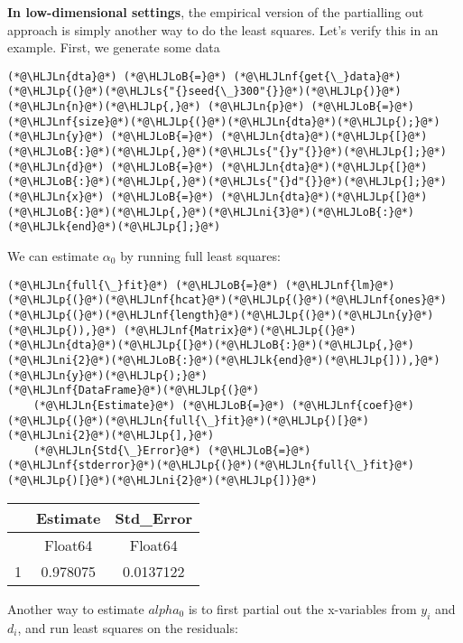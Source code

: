\documentclass[12pt,a4paper]{article}
\newcommand{\HLJLk}[1]{\textcolor[RGB]{148,91,176}{\textbf{#1}}}
\newcommand{\HLJLn}[1]{#1}
\newcommand{\HLJLnf}[1]{\textcolor[RGB]{66,102,213}{#1}}
\newcommand{\HLJLs}[1]{\textcolor[RGB]{201,61,57}{#1}}
\newcommand{\HLJLni}[1]{\textcolor[RGB]{59,151,46}{#1}}
\newcommand{\HLJLoB}[1]{\textcolor[RGB]{102,102,102}{\textbf{#1}}}
\newcommand{\HLJLp}[1]{#1}
\begin{document}
\textbf{In low-dimensional settings}, the empirical version of the partialling out approach is simply another way to do the least squares. Let's verify this in an example. First, we generate some data


\begin{lstlisting}
(*@\HLJLn{dta}@*) (*@\HLJLoB{=}@*) (*@\HLJLnf{get{\_}data}@*)(*@\HLJLp{(}@*)(*@\HLJLs{"{}seed{\_}300"{}}@*)(*@\HLJLp{)}@*)
(*@\HLJLn{n}@*)(*@\HLJLp{,}@*) (*@\HLJLn{p}@*) (*@\HLJLoB{=}@*) (*@\HLJLnf{size}@*)(*@\HLJLp{(}@*)(*@\HLJLn{dta}@*)(*@\HLJLp{);}@*)
(*@\HLJLn{y}@*) (*@\HLJLoB{=}@*) (*@\HLJLn{dta}@*)(*@\HLJLp{[}@*)(*@\HLJLoB{:}@*)(*@\HLJLp{,}@*)(*@\HLJLs{"{}y"{}}@*)(*@\HLJLp{];}@*)
(*@\HLJLn{d}@*) (*@\HLJLoB{=}@*) (*@\HLJLn{dta}@*)(*@\HLJLp{[}@*)(*@\HLJLoB{:}@*)(*@\HLJLp{,}@*)(*@\HLJLs{"{}d"{}}@*)(*@\HLJLp{];}@*)
(*@\HLJLn{x}@*) (*@\HLJLoB{=}@*) (*@\HLJLn{dta}@*)(*@\HLJLp{[}@*)(*@\HLJLoB{:}@*)(*@\HLJLp{,}@*)(*@\HLJLni{3}@*)(*@\HLJLoB{:}@*)(*@\HLJLk{end}@*)(*@\HLJLp{];}@*)
\end{lstlisting}


We can estimate $\alpha_0$ by running full least squares:


\begin{lstlisting}
(*@\HLJLn{full{\_}fit}@*) (*@\HLJLoB{=}@*) (*@\HLJLnf{lm}@*)(*@\HLJLp{(}@*)(*@\HLJLnf{hcat}@*)(*@\HLJLp{(}@*)(*@\HLJLnf{ones}@*)(*@\HLJLp{(}@*)(*@\HLJLnf{length}@*)(*@\HLJLp{(}@*)(*@\HLJLn{y}@*)(*@\HLJLp{)),}@*) (*@\HLJLnf{Matrix}@*)(*@\HLJLp{(}@*)(*@\HLJLn{dta}@*)(*@\HLJLp{[}@*)(*@\HLJLoB{:}@*)(*@\HLJLp{,}@*)(*@\HLJLni{2}@*)(*@\HLJLoB{:}@*)(*@\HLJLk{end}@*)(*@\HLJLp{])),}@*) (*@\HLJLn{y}@*)(*@\HLJLp{);}@*)
(*@\HLJLnf{DataFrame}@*)(*@\HLJLp{(}@*)
    (*@\HLJLn{Estimate}@*) (*@\HLJLoB{=}@*) (*@\HLJLnf{coef}@*)(*@\HLJLp{(}@*)(*@\HLJLn{full{\_}fit}@*)(*@\HLJLp{)[}@*)(*@\HLJLni{2}@*)(*@\HLJLp{],}@*) 
    (*@\HLJLn{Std{\_}Error}@*) (*@\HLJLoB{=}@*) (*@\HLJLnf{stderror}@*)(*@\HLJLp{(}@*)(*@\HLJLn{full{\_}fit}@*)(*@\HLJLp{)[}@*)(*@\HLJLni{2}@*)(*@\HLJLp{])}@*)
\end{lstlisting}


\begin{tabular}{r|cc}
	& Estimate & Std\_Error\\
	\hline
	& Float64 & Float64\\
	\hline
	1 & 0.978075 & 0.0137122 \\
\end{tabular}


Another way to estimate $alpha_0$ is to first partial out the x-variables from $y_i$ and $d_i$, and run least squares on the residuals:
\end{document}
